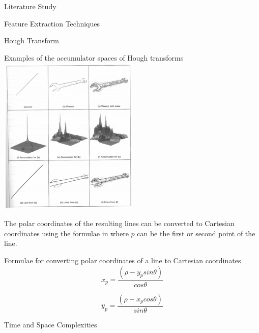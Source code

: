 \documentclass{matthijs}
\begin{document}
\begin{hoofdstuk}{Literature Study}
\begin{paragraaf}{Feature Extraction Techniques}
\begin{subparagraaf}{Hough Transform}
				\begin{figuur}{Examples of the accumulator spaces of Hough transforms}
					\includegraphics[width=0.5\textwidth]{solberg2009hough-img1.png}
					\cite{solberg2009hough}
				\end{figuur}

				The polar coordinates of the resulting lines can be converted to Cartesian coordinates using the formulae in  where $p$ can be the first or second point of the line.
				
				\begin{figuur}{Formulae for converting polar coordinates of a line to Cartesian coordinates}
					\begin{equation*}
						x_p = \frac{(\rho - y_p sin \theta)}{cos \theta}
					\end{equation*}

					\vspace{-2ex}

					\begin{equation*}
						y_p = \frac{(\rho - x_p cos \theta)}{sin \theta}
					\end{equation*}

					\vspace{1ex}

					\cite{dawkins2018polar}
				\end{figuur}
			
				\begin{subsubparagraaf}{Time and Space Complexities}
					

\end{subsubparagraaf}
\end{subparagraaf}
\end{paragraaf}
\end{hoofdstuk}
\end{document}
